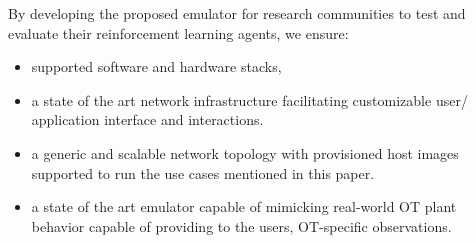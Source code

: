By developing the proposed emulator for research communities to test and evaluate their reinforcement learning agents, we ensure:
\begin{itemize}
    \item supported software and hardware stacks,
    \item a state of the art network infrastructure facilitating customizable user/ application interface and interactions.
    \item a generic and scalable network topology with provisioned host images supported to run the use cases mentioned in this paper.
    \item a state of the art emulator capable of mimicking real-world OT plant behavior capable of providing to the users, OT-specific observations.
\end{itemize}



